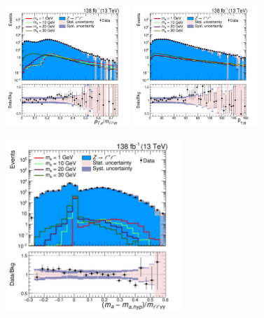 \begin{figure}[htbp]
  \begin{center}
		\includegraphics[width=0.42\textwidth]{figures/chapter04/BDT_input/var_PtaOverMh_log.pdf}
        \includegraphics[width=0.42\textwidth]{figures/chapter04/BDT_input/H_pt_log.pdf} \\
    \label{fig:BDT_Vars3}
\end{center}
\end{figure}

\begin{figure}[htbp]
  \begin{center}
		\includegraphics[width=0.6\textwidth]{figures/chapter04/BDT_input/param_log.pdf}
    \label{fig:BDT_Vars4}
\end{center}
\end{figure}

